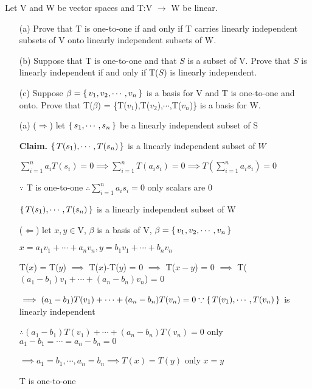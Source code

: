 Let V and W be vector spaces and T:V $\rightarrow$ W be linear.

\begin{enumerate}
	\item[(a)] Prove that T is one-to-one if and only if T carries linearly independent subsets of V onto linearly independent subsets of W.
	\item[(b)] Suppose that T is one-to-one and that $S$ is a subset of V. Prove that $S$ is linearly independent if and only if T($S$) is linearly independent.
	\item[(c)] Suppose $\beta = \left\{ \,v_1,v_2,\cdots,v_n \,\right\}$ is a basis for V and T is one-to-one and onto. Prove that T($\beta$) = \{T($v_1$),T($v_2$),$\cdots$,T($v_n$)\} is a basis for W.
\end{enumerate}

\begin{tcolorbox}
\begin{solution}
	\begin{enumerate}
		\item[(a)]
		($\Rightarrow$) let $\left\{ \,s_1,\cdots,s_n \,\right\}$ be a linearly independent subset of S
		
		\textbf{Claim.} $\left\{ \,T(s_1),\cdots,T(s_n) \,\right\}$ is a linearly independent subset of $W$
		
		$\sum^{n}_{i=1}a_iT(s_i) = 0 \implies \sum^{n}_{i=1}T(a_is_i) = 0 \implies T(\sum^{n}_{i=1}a_is_i)=0$
		
		$\because $ T is one-to-one $\therefore \sum^{n}_{i=1}a_is_i = 0$ only scalars are $0$
		
		$\left\{ \,T(s_1),\cdots,T(s_n) \,\right\}$ is a linearly independent subset of W
		
		($\Leftarrow$) let $x,y \in $V, $\beta$ is a basis of V, $\beta = \left\{ \,v_1,v_2,\cdots,v_n \,\right\}$
		
		$x = a_1v_1+\cdots+a_nv_n, y= b_1v_1 + \cdots + b_nv_n$
		
		T($x$) = T($y$) $\implies$ T($x$)-T($y$) = 0 $\implies$ T($x-y$) = 0 $\implies$ T($(a_1-b_1)v_1+\cdots+(a_n-b_n)v_n$) = $0$
		
		$\implies (a_1-b_1)T(v_1) + \cdots + (a_n-b_n)T(v_n) = 0 \because \left\{ \,T(v_1),\cdots,T(v_n) \,\right\}$ is linearly independent
		
		$\therefore (a_1 - b_1)T(v_1) + \cdots + (a_n-b_n)T(v_n) = 0$ only $a_1-b_1=\cdots=a_n-b_n=0$
		
		$\implies a_1 = b_1,\cdots,a_n=b_n \implies T(x) = T(y)$ only $x=y$
		
		T is one-to-one
	\end{enumerate}

\end{solution}

\end{tcolorbox}

